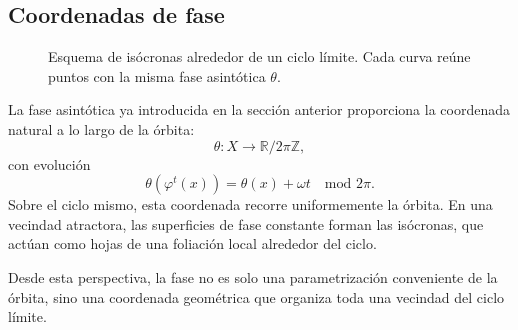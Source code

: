 \subsection{Coordenadas de fase}
\begin{figure}[t]
\centering
{}
\caption{Esquema de is\'ocronas alrededor de un ciclo l\'imite. Cada curva re\'une puntos con la misma fase asint\'otica \(\theta\).}
\label{fig:koopman_isochrones}
\end{figure}

La fase asintótica ya introducida en la sección anterior proporciona la coordenada natural a lo largo de la órbita:
\begin{equation}
\theta:X\to \mathbb{R}/2\pi\mathbb{Z},
\label{eq:Koopman_tube_phase}
\end{equation}
con evolución
\begin{equation}
\theta(\varphi^t(x))=\theta(x)+\omega t
\quad \text{mod } 2\pi.
\label{eq:Koopman_tube_phase_evolution}
\end{equation}
Sobre el ciclo mismo, esta coordenada recorre uniformemente la órbita. En una vecindad atractora, las superficies de fase constante forman las isócronas, que actúan como hojas de una foliación local alrededor del ciclo.

Desde esta perspectiva, la fase no es solo una parametrización conveniente de la órbita, sino una coordenada geométrica que organiza toda una vecindad del ciclo límite.

